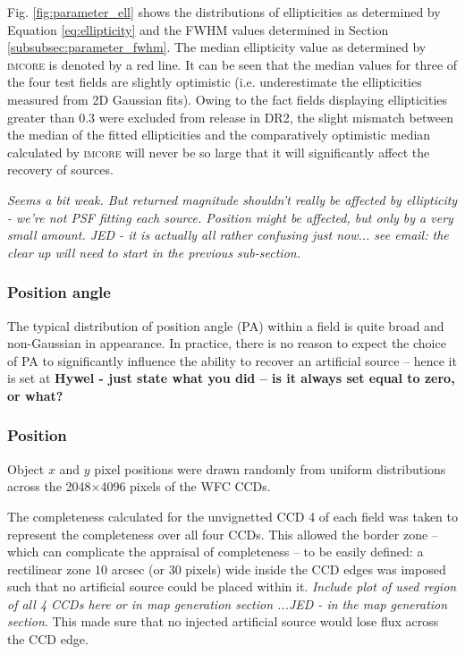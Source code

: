\documentclass[a4paper,useAMS,usenatbib]{mn2e}
\begin{document}
Fig. \ref{fig:parameter_ell} shows the distributions of ellipticities as
determined by Equation \ref{eq:ellipticity} and the FWHM values determined in
Section \ref{subsubsec:parameter_fwhm}. The median ellipticity value as
determined by \textsc{imcore} is denoted by a red line. It can be seen that the
median values for three of the four test fields are slightly optimistic (i.e.
underestimate the ellipticities measured from 2D Gaussian fits). Owing to the
fact fields displaying ellipticities greater than 0.3 were excluded from release 
in DR2, the slight mismatch between the median of the fitted ellipticities and the 
comparatively optimistic median calculated by \textsc{imcore} will never be so large 
that it will significantly affect the recovery of sources.

\textit{Seems a bit weak. But returned magnitude shouldn't really be affected by 
ellipticity - we're not PSF fitting each source. Position might be affected, but only by 
a very small amount.  JED - it is actually all rather confusing just now... see
email: the clear up will need to start in the previous sub-section.}

\subsubsection{Position angle}
\label{subsubsec:position_angle}
The typical distribution of position angle (PA) within a field is quite broad and non-Gaussian in
appearance.  In practice, there is no reason to expect the choice of PA to significantly influence 
the ability to recover an artificial source -- hence it is set at {\bf Hywel - just state what you 
did -- is it always set equal to zero, or what?}

\subsubsection{Position}
\label{subsubsec:position}
Object $x$ and $y$ pixel positions were drawn randomly from uniform
distributions across the 2048$\times$4096 pixels of the WFC CCDs.

The completeness calculated for the unvignetted CCD 4 of each field was taken to represent 
the completeness over all four CCDs.  This allowed the border zone -- which can complicate the 
appraisal of completeness -- to be easily defined: a rectilinear zone 10 arcsec (or 30 pixels) wide
inside the CCD edges was imposed such that no artificial source could be placed within it.  
\textsl{Include plot of used region of all 4 CCDs here or in map generation section ...JED - 
in the map generation section}.  This made sure that no injected artificial source would lose
flux across the CCD edge.
\end{document}
